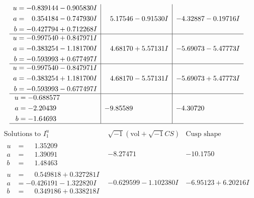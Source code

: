 \documentclass[1p]{elsarticle_modified}
\theoremstyle{definition}
\newcommand{\I}{\sqrt{-1}}
\begin{document}
$$\begin{array}{c|c|c}
\begin{aligned}
u &= -0.839144 - 0.905830 I \\
a &= \phantom{-}0.354184 - 0.747930 I \\
b &= -0.427794 + 0.712268 I\end{aligned}
 & \phantom{-}5.17546 - 0.91530 I & -4.32887 - 0.19716 I \\ \hline\begin{aligned}
u &= -0.997540 + 0.847971 I \\
a &= -0.383254 - 1.181700 I \\
b &= -0.593993 + 0.677497 I\end{aligned}
 & \phantom{-}4.68170 + 5.57131 I & -5.69073 - 5.47773 I \\ \hline\begin{aligned}
u &= -0.997540 - 0.847971 I \\
a &= -0.383254 + 1.181700 I \\
b &= -0.593993 - 0.677497 I\end{aligned}
 & \phantom{-}4.68170 - 5.57131 I & -5.69073 + 5.47773 I \\ \hline\begin{aligned}
u &= -0.688577\phantom{ +0.000000I} \\
a &= -2.20439\phantom{ +0.000000I} \\
b &= -1.64693\phantom{ +0.000000I}\end{aligned}
 & -9.85589\phantom{ +0.000000I} & -4.30720\phantom{ +0.000000I}\\
 \hline 
 \end{array}$$\newpage$$\begin{array}{c|c|c}  
\text{Solutions to }I^u_{1}& \I (\text{vol} + \sqrt{-1}CS) & \text{Cusp shape}\\
 \hline 
\begin{aligned}
u &= \phantom{-}1.35209\phantom{ +0.000000I} \\
a &= \phantom{-}1.39091\phantom{ +0.000000I} \\
b &= \phantom{-}1.48463\phantom{ +0.000000I}\end{aligned}
 & -8.27471\phantom{ +0.000000I} & -10.1750\phantom{ +0.000000I} \\ \hline\begin{aligned}
u &= \phantom{-}0.549818 + 0.327281 I \\
a &= -0.426191 - 1.322820 I \\
b &= \phantom{-}0.349186 + 0.338218 I\end{aligned}
 & -0.629599 - 1.102380 I & -6.95123 + 6.20216 I \\ \hline\begin{aligned}

\end{aligned}
\end{array}$$
\end{document}
